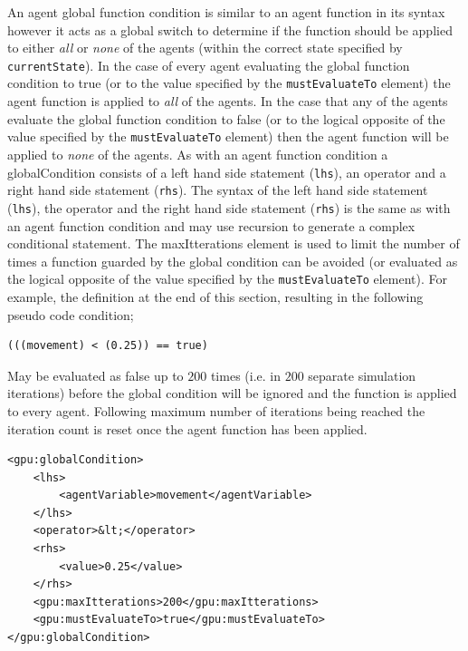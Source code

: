 \documentclass[11pt, a4paper, onecolumn, oneside]{report}
\begin{document}
An agent global function condition is similar to an agent function in its syntax however it acts as a global switch to determine if the function should be applied to either \emph{all} or \emph{none} of the agents (within the correct state specified by \texttt{currentState}).
In the case of every agent evaluating the global function condition to true (or to the value specified by the \texttt{mustEvaluateTo} element) the agent function is applied to \emph{all} of the agents.
In the case that any of the agents evaluate the global function condition to false (or to the logical opposite of the value specified by the \texttt{mustEvaluateTo} element) then the agent function will be applied to \emph{none} of the agents.
As with an agent function condition a globalCondition consists of a left hand side statement (\texttt{lhs}), an operator and a right hand side statement (\texttt{rhs}).
The syntax of the left hand side statement (\texttt{lhs}), the operator and the right hand side statement (\texttt{rhs}) is the same as with an agent function condition and may use recursion to generate a complex conditional statement.
The maxItterations element is used to limit the number of times a function guarded by the global condition can be avoided (or evaluated as the logical opposite of the value specified by the \texttt{mustEvaluateTo} element).
For example, the definition at the end of this section, resulting in the following pseudo code condition;

\begin{verbatim}
(((movement) < (0.25)) == true)
\end{verbatim}
May be evaluated as false up to $200$ times (i.e. in $200$ separate simulation iterations) before the global condition will be ignored and the function is applied to every agent.
Following maximum number of iterations being reached the iteration count is reset once the agent function has been applied.

\begin{verbatim}
<gpu:globalCondition>
    <lhs>
        <agentVariable>movement</agentVariable>
    </lhs>
    <operator>&lt;</operator>
    <rhs>
        <value>0.25</value>
    </rhs>
    <gpu:maxItterations>200</gpu:maxItterations>
    <gpu:mustEvaluateTo>true</gpu:mustEvaluateTo>
</gpu:globalCondition>
\end{verbatim}
\end{document}

